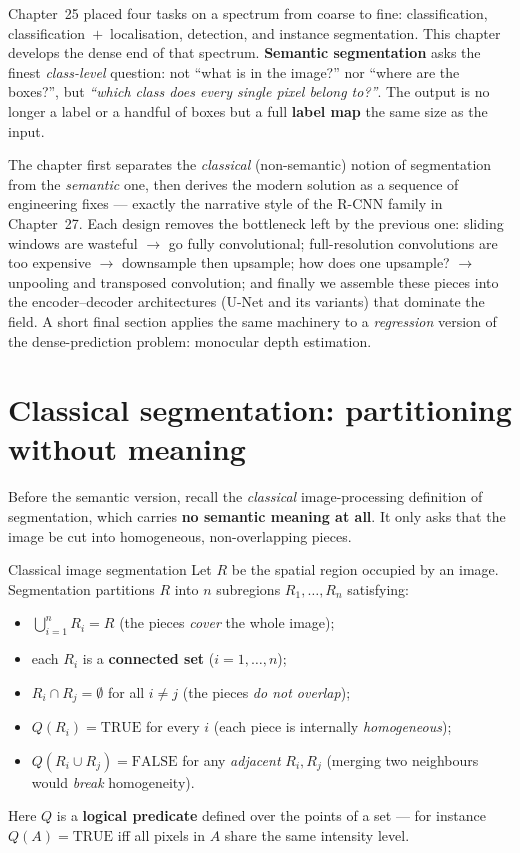 \documentclass{report}
\begin{document}
Chapter~25 placed four tasks on a spectrum from coarse to fine: classification,
classification~$+$~localisation, detection, and instance segmentation. This
chapter develops the dense end of that spectrum. \textbf{Semantic
segmentation} asks the finest \emph{class-level} question: not ``what is in the
image?'' nor ``where are the boxes?'', but \emph{``which class does every single
pixel belong to?''}. The output is no longer a label or a handful of boxes but
a full \textbf{label map} the same size as the input.

The chapter first separates the \emph{classical} (non-semantic) notion of
segmentation from the \emph{semantic} one, then derives the modern solution as a
sequence of engineering fixes --- exactly the narrative style of the R-CNN
family in Chapter~27. Each design removes the bottleneck left by the previous
one: sliding windows are wasteful $\to$ go fully convolutional; full-resolution
convolutions are too expensive $\to$ downsample then upsample; how does one
upsample? $\to$ unpooling and transposed convolution; and finally we assemble
these pieces into the encoder--decoder architectures (U-Net and its variants)
that dominate the field. A short final section applies the same machinery to a
\emph{regression} version of the dense-prediction problem: monocular depth
estimation.

\section{Classical segmentation: partitioning without meaning}

Before the semantic version, recall the \emph{classical} image-processing
definition of segmentation, which carries \textbf{no semantic meaning at all}.
It only asks that the image be cut into homogeneous, non-overlapping pieces.

\begin{defbox}{Classical image segmentation}
Let $R$ be the spatial region occupied by an image. Segmentation partitions $R$
into $n$ subregions $R_1,\dots,R_n$ satisfying:
\begin{itemize}
\item $\bigcup_{i=1}^{n} R_i = R$ \quad(the pieces \emph{cover} the whole
image);
\item each $R_i$ is a \textbf{connected set} ($i=1,\dots,n$);
\item $R_i \cap R_j = \emptyset$ for all $i \neq j$ \quad(the pieces
\emph{do not overlap});
\item $Q(R_i) = \text{TRUE}$ for every $i$ \quad(each piece is internally
\emph{homogeneous});
\item $Q(R_i \cup R_j) = \text{FALSE}$ for any \emph{adjacent} $R_i,R_j$
\quad(merging two neighbours would \emph{break} homogeneity).
\end{itemize}
Here $Q$ is a \textbf{logical predicate} defined over the points of a set ---
for instance $Q(A) = \text{TRUE}$ iff all pixels in $A$ share the same intensity
level.
\end{defbox}
\end{document}
